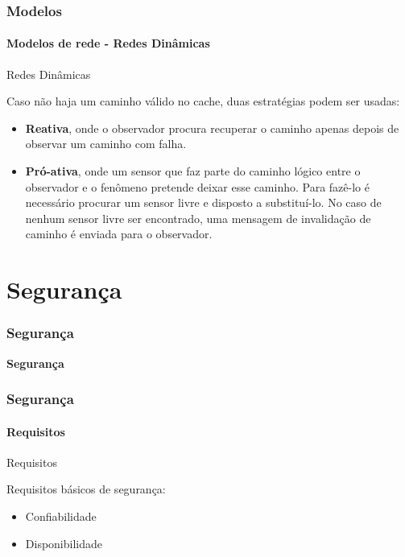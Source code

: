 \documentclass[notes]{beamer}
\begin{document}
\begin{frame}
\label{slide_66}
\frametitle{Modelos}
\framesubtitle{Modelos de rede - Redes Dinâmicas}

\begin{block}{Redes Dinâmicas}

Caso não haja um caminho válido no cache, duas estratégias podem ser usadas: \pause

\begin{itemize}

\item \textbf{Reativa}, onde o observador procura recuperar o caminho apenas depois de observar um caminho com falha. \pause

\item \textbf{Pró-ativa}, onde um sensor que faz parte do caminho lógico entre o observador e o fenômeno pretende deixar esse caminho. Para fazê-lo é necessário procurar um sensor livre e disposto a substituí-lo. No caso de nenhum sensor livre ser encontrado, uma mensagem de invalidação de caminho é enviada para o observador. 

\end{itemize}

\end{block}

\end{frame}

\section{Segurança}

\begin{frame}
\label{slide_67}
\frametitle{Segurança}

\begin{block}

 \center \textbf{Segurança}

\end{block}

\end{frame}

\begin{frame}
\label{slide_68}
\frametitle{Segurança}
\framesubtitle{Requisitos}

\begin{block}{Requisitos}

Requisitos básicos de segurança: \pause

\begin{itemize}

\item Confiabilidade \pause
\item Disponibilidade

\end{itemize}

\end{block} 

\end{frame}
\end{document}
